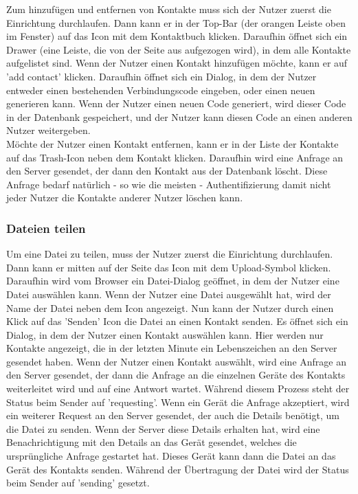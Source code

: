 \documentclass[a4paper]{article}
\begin{document}
Zum hinzufügen und entfernen von Kontakte muss sich der Nutzer zuerst die
Einrichtung durchlaufen. Dann kann er in der Top-Bar (der orangen Leiste oben im
Fenster) auf das Icon mit dem Kontaktbuch klicken. Daraufhin öffnet sich ein
Drawer (eine Leiste, die von der Seite aus aufgezogen wird), in dem alle
Kontakte aufgelistet sind. Wenn der Nutzer einen Kontakt hinzufügen möchte, kann
er auf 'add contact' klicken. Daraufhin öffnet sich ein Dialog, in dem der
Nutzer entweder einen bestehenden Verbindungscode eingeben, oder einen neuen
generieren kann. Wenn der Nutzer einen neuen Code generiert, wird dieser Code in
der Datenbank gespeichert, und der Nutzer kann diesen Code an einen anderen
Nutzer weitergeben.\\
Möchte der Nutzer einen Kontakt entfernen, kann er in der Liste der Kontakte auf
das Trash-Icon neben dem Kontakt klicken. Daraufhin wird eine Anfrage an den
Server gesendet, der dann den Kontakt aus der Datenbank löscht. Diese Anfrage
bedarf natürlich - so wie die meisten - Authentifizierung damit nicht jeder
Nutzer die Kontakte anderer Nutzer löschen kann.



\subsubsection{Dateien teilen}

Um eine Datei zu teilen, muss der Nutzer zuerst die Einrichtung durchlaufen.
Dann kann er mitten auf der Seite das Icon mit dem Upload-Symbol klicken.
Daraufhin wird vom Browser ein Datei-Dialog geöffnet, in dem der Nutzer eine
Datei auswählen kann. Wenn der Nutzer eine Datei ausgewählt hat, wird der Name
der Datei neben dem Icon angezeigt. Nun kann der Nutzer durch einen Klick auf
das 'Senden' Icon die Datei an einen Kontakt senden. Es öffnet sich ein Dialog,
in dem der Nutzer einen Kontakt auswählen kann. Hier werden nur Kontakte
angezeigt, die in der letzten Minute ein Lebenszeichen an den Server gesendet
haben. Wenn der Nutzer einen Kontakt auswählt, wird eine Anfrage an den Server
gesendet, der dann die Anfrage an die einzelnen Geräte des Kontakts weiterleitet
wird und auf eine Antwort wartet. Während diesem Prozess steht der Status beim
Sender auf 'requesting'. Wenn ein Gerät die Anfrage akzeptiert, wird ein
weiterer Request an den Server gesendet, der auch die Details benötigt, um die
Datei zu senden. Wenn der Server diese Details erhalten hat, wird eine
Benachrichtigung mit den Details an das Gerät gesendet, welches die
ursprüngliche Anfrage gestartet hat. Dieses Gerät kann dann die Datei an das
Gerät des Kontakts senden. Während der Übertragung der Datei wird der Status
beim Sender auf 'sending' gesetzt.
\end{document}
